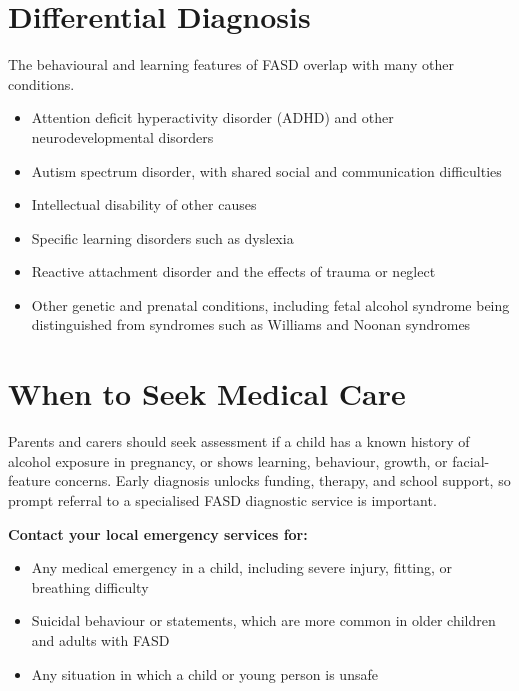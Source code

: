\section*{Differential Diagnosis}
The behavioural and learning features of FASD overlap with many other conditions.
\begin{itemize}
    \item Attention deficit hyperactivity disorder (ADHD) and other neurodevelopmental disorders
    \item Autism spectrum disorder, with shared social and communication difficulties
    \item Intellectual disability of other causes
    \item Specific learning disorders such as dyslexia
    \item Reactive attachment disorder and the effects of trauma or neglect
    \item Other genetic and prenatal conditions, including fetal alcohol syndrome being distinguished from syndromes such as Williams and Noonan syndromes
\end{itemize}

\section*{When to Seek Medical Care}
Parents and carers should seek assessment if a child has a known history of alcohol exposure in pregnancy, or shows learning, behaviour, growth, or facial-feature concerns. Early diagnosis unlocks funding, therapy, and school support, so prompt referral to a specialised FASD diagnostic service is important.

\textbf{Contact your local emergency services for:}
\begin{itemize}
    \item Any medical emergency in a child, including severe injury, fitting, or breathing difficulty
    \item Suicidal behaviour or statements, which are more common in older children and adults with FASD
    \item Any situation in which a child or young person is unsafe
\end{itemize}

